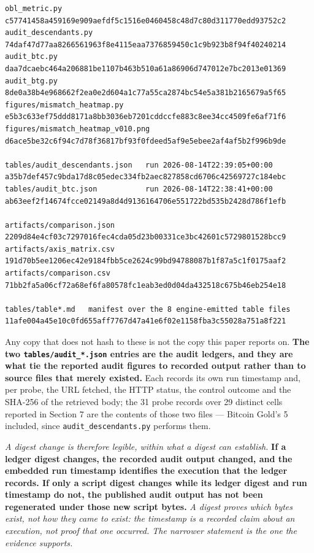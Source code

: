 \documentclass[
]{article}
\begin{document}
\begin{verbatim}
obl_metric.py
c57741458a459169e909aefdf5c1516e0460458c48d7c80d311770edd93752c2
audit_descendants.py
74daf47d77aa8266561963f8e4115eaa7376859450c1c9b923b8f94f40240214
audit_btc.py
daa7dcaebc464a206881be1107b463b510a61a86906d747012e7bc2013e01369
audit_btg.py
8de0a38b4e968662f2ea0e2d604a1c77a55ca2874bc54e5a381b2165679a5f65
figures/mismatch_heatmap.py
e5b3c633ef75ddd8171a8bb3036eb7201cddccfe883c8ee34cc4509fe6af71f6
figures/mismatch_heatmap_v010.png
d6ace5be32c6f94c7d78f36817bf93f0fdeed5af9e5ebee2af4af5b2f996b9de

tables/audit_descendants.json   run 2026-08-14T22:39:05+00:00
a35b7def457c9bda17d8c05edec334fb2aec827858cd6706c42569727c184ebc
tables/audit_btc.json           run 2026-08-14T22:38:41+00:00
ab63eef2f14674fcce02149a8d4d9136164706e551722bd535b2428d786f1efb

artifacts/comparison.json
2209d84e4cf03c7297016fec4cda05d23b00331ce3bc42601c5729801528bcc9
artifacts/axis_matrix.csv
191d70b5ee1206ec42e9184fbb5ce2624c99bd94788087b1f87a5c1f0175aaf2
artifacts/comparison.csv
71bb2fa5a06cf72a68ef6fa80578fc1eab3ed0d04da432518c675b46eb254e18

tables/table*.md   manifest over the 8 engine-emitted table files
11afe004a45e10c0fd655aff7767d47a41e6f02e1158fba3c55028a751a8f221
\end{verbatim}

Any copy that does not hash to these is not the copy this paper reports
on. \textbf{The two \texttt{tables/audit\_*.json} entries are the audit
ledgers, and they are what tie the reported audit figures to recorded
output rather than to source files that merely existed.} Each records
its own run timestamp and, per probe, the URL fetched, the HTTP status,
the control outcome and the SHA-256 of the retrieved body; the 31 probe
records over 29 distinct cells reported in Section 7 are the contents of
those two files --- Bitcoin Gold's 5 included, since
\texttt{audit\_descendants.py} performs them.

\emph{A digest change is therefore legible, within what a digest can
establish.} \textbf{If a ledger digest changes, the recorded audit
output changed, and the embedded run timestamp identifies the execution
that the ledger records. If only a script digest changes while its
ledger digest and run timestamp do not, the published audit output has
not been regenerated under those new script bytes.} \emph{A digest
proves which bytes exist, not how they came to exist: the timestamp is a
recorded claim about an execution, not proof that one occurred. The
narrower statement is the one the evidence supports.}
\end{document}
